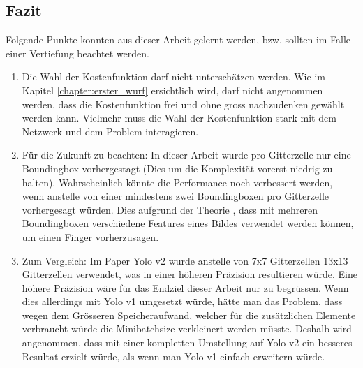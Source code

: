 \subsection{Fazit}
Folgende Punkte konnten aus dieser Arbeit gelernt werden, bzw. sollten im Falle einer Vertiefung beachtet werden. 
\begin{enumerate}
\item Die Wahl der Kostenfunktion darf nicht unterschätzen werden. 
Wie im Kapitel \ref{chapter:erster_wurf} ersichtlich wird, darf nicht angenommen werden, dass die Kostenfunktion frei und ohne gross nachzudenken gewählt werden kann. 
Vielmehr muss die Wahl der Kostenfunktion stark mit dem Netzwerk und dem Problem interagieren. 

\item Für die Zukunft zu beachten: In dieser Arbeit wurde pro Gitterzelle nur eine Boundingbox vorhergestagt (Dies um die Komplexität vorerst niedrig zu halten). Wahrscheinlich könnte die Performance noch verbessert werden, wenn anstelle von einer mindestens zwei Boundingboxen pro Gitterzelle vorhergesagt würden. Dies aufgrund der Theorie \cite{PrivateCommunication}, dass mit mehreren Boundingboxen verschiedene Features eines Bildes verwendet werden können, um einen Finger vorherzusagen.

\item Zum Vergleich: Im Paper Yolo v2 wurde anstelle von 7x7 Gitterzellen 13x13 Gitterzellen verwendet, was in einer höheren Präzision resultieren würde. 
Eine höhere Präzision wäre für das Endziel dieser Arbeit nur zu begrüssen. 
Wenn dies allerdings mit Yolo v1 umgesetzt würde, hätte man das Problem, dass wegen dem Grösseren Speicheraufwand, welcher für die zusätzlichen Elemente \grqq{}verbraucht\grqq{} würde die Minibatchsize verkleinert werden müsste. 
Deshalb wird angenommen, dass mit einer kompletten Umstellung auf Yolo v2 ein besseres Resultat erzielt würde, als wenn man Yolo v1 einfach erweitern würde.
\end{enumerate}
